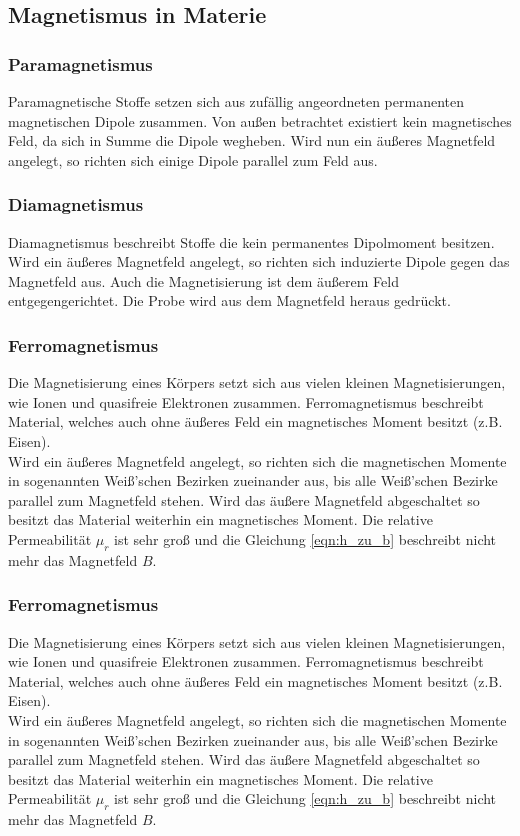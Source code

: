 \subsection{Magnetismus in Materie}

\subsubsection{Paramagnetismus}
Paramagnetische Stoffe setzen sich aus zufällig angeordneten permanenten magnetischen Dipole zusammen. Von außen betrachtet existiert kein
magnetisches Feld, da sich in Summe die Dipole wegheben. Wird nun ein äußeres Magnetfeld angelegt, so richten
sich einige Dipole parallel zum Feld aus.

\subsubsection{Diamagnetismus}
Diamagnetismus beschreibt Stoffe die kein permanentes Dipolmoment besitzen. Wird ein äußeres Magnetfeld angelegt, so richten sich
induzierte Dipole gegen das Magnetfeld aus. Auch die Magnetisierung ist dem äußerem Feld entgegengerichtet. Die Probe wird aus dem Magnetfeld heraus gedrückt.

\subsubsection{Ferromagnetismus}
Die Magnetisierung eines Körpers setzt sich aus vielen kleinen Magnetisierungen, wie Ionen und quasifreie Elektronen zusammen.
Ferromagnetismus beschreibt Material, welches auch ohne äußeres Feld ein magnetisches Moment besitzt (z.B. Eisen).\\
Wird ein äußeres Magnetfeld angelegt, so richten sich die magnetischen Momente in sogenannten Weiß'schen Bezirken zueinander aus,
bis alle Weiß'schen Bezirke parallel zum Magnetfeld stehen. Wird das äußere Magnetfeld abgeschaltet so besitzt das Material weiterhin
ein magnetisches Moment. Die relative Permeabilität $\mu_r$ ist sehr groß und die Gleichung \eqref{eqn:h_zu_b} beschreibt nicht mehr
das Magnetfeld $B$.\subsubsection{Ferromagnetismus}
Die Magnetisierung eines Körpers setzt sich aus vielen kleinen Magnetisierungen, wie Ionen und quasifreie Elektronen zusammen.
Ferromagnetismus beschreibt Material, welches auch ohne äußeres Feld ein magnetisches Moment besitzt (z.B. Eisen).\\
Wird ein äußeres Magnetfeld angelegt, so richten sich die magnetischen Momente in sogenannten Weiß'schen Bezirken zueinander aus,
bis alle Weiß'schen Bezirke parallel zum Magnetfeld stehen. Wird das äußere Magnetfeld abgeschaltet so besitzt das Material weiterhin
ein magnetisches Moment. Die relative Permeabilität $\mu_r$ ist sehr groß und die Gleichung \eqref{eqn:h_zu_b} beschreibt nicht mehr
das Magnetfeld $B$.

